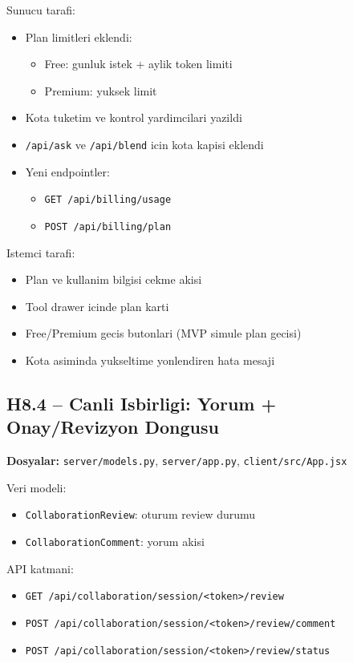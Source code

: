 \documentclass[12pt,a4paper]{article}
\begin{document}
Sunucu tarafi:
\begin{itemize}[leftmargin=*]
  \item Plan limitleri eklendi:
  \begin{itemize}[leftmargin=*]
    \item Free: gunluk istek + aylik token limiti
    \item Premium: yuksek limit
  \end{itemize}
  \item Kota tuketim ve kontrol yardimcilari yazildi
  \item \texttt{/api/ask} ve \texttt{/api/blend} icin kota kapisi eklendi
  \item Yeni endpointler:
  \begin{itemize}[leftmargin=*]
    \item \texttt{GET /api/billing/usage}
    \item \texttt{POST /api/billing/plan}
  \end{itemize}
\end{itemize}

Istemci tarafi:
\begin{itemize}[leftmargin=*]
  \item Plan ve kullanim bilgisi cekme akisi
  \item Tool drawer icinde plan karti
  \item Free/Premium gecis butonlari (MVP simule plan gecisi)
  \item Kota asiminda yukseltime yonlendiren hata mesaji
\end{itemize}

\subsection{H8.4 -- Canli Isbirligi: Yorum + Onay/Revizyon Dongusu}
\textbf{Dosyalar:} \texttt{server/models.py}, \texttt{server/app.py}, \texttt{client/src/App.jsx}

Veri modeli:
\begin{itemize}[leftmargin=*]
  \item \texttt{CollaborationReview}: oturum review durumu
  \item \texttt{CollaborationComment}: yorum akisi
\end{itemize}

API katmani:
\begin{itemize}[leftmargin=*]
  \item \texttt{GET /api/collaboration/session/<token>/review}
  \item \texttt{POST /api/collaboration/session/<token>/review/comment}
  \item \texttt{POST /api/collaboration/session/<token>/review/status}
\end{itemize}
\end{document}
